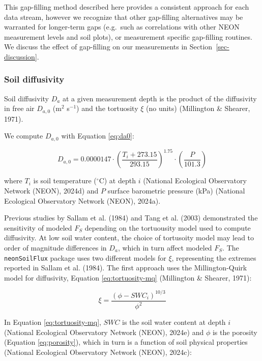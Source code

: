 \documentclass[
  letterpaper,
  DIV=11,
  numbers=noendperiod]{scrartcl}
\begin{document}
This gap-filling method described here provides a consistent approach
for each data stream, however we recognize that other gap-filling
alternatives may be warranted for longer-term gaps (e.g.~such as
correlations with other NEON measurement levels and soil plots), or
measurement specific gap-filling routines. We discuss the effect of
gap-filling on our measurements in Section~\ref{sec-discussion}.

\subsubsection{Soil diffusivity}\label{sec-compute-diffusivity}

Soil diffusivity \(D_{a}\) at a given measurement depth is the product
of the diffusivity in free air \(D_{a,0}\) (m\(^{2}\) s\(^{-1}\)) and
the tortuosity \(\xi\) (no units) (Millington \& Shearer, 1971).

We compute \(D_{a,0}\) with Equation \ref{eq:da0}:

\begin{equation}
  D_{a,0} = 0.0000147 \cdot \left( \frac{T_{i} + 273.15}{293.15} \right)^{1.75} \cdot \left( \frac{P}{101.3} \right)
  \label{eq:da0}
\end{equation}

where \(T_{i}\) is soil temperature (\(^\circ\)C) at depth \(i\)
(National Ecological Observatory Network (NEON), 2024d) and \(P\)
surface barometric pressure (kPa) (National Ecological Observatory
Network (NEON), 2024a).

Previous studies by Sallam et al. (1984) and Tang et al. (2003)
demonstrated the sensitivity of modeled \(F_{S}\) depending on the
tortuousity model used to compute diffusivity. At low soil water
content, the choice of tortusoity model may lead to order of magnitude
differences in \(D_{a}\), which in turn affect modeled \(F_{S}\). The
\texttt{neonSoilFlux} package uses two different models for \(\xi\),
representing the extremes reported in Sallam et al. (1984). The first
approach uses the Millington-Quirk model for diffusivity, Equation
\ref{eq:tortuosity-mq} (Millington \& Shearer, 1971):

\begin{equation}
  \xi = \frac{(\phi - SWC_{i})^{10/3}}{\phi^{2}}
  \label{eq:tortuosity-mq}
\end{equation}

In Equation \ref{eq:tortuosity-mq}, \(SWC\) is the soil water content at
depth \(i\) (National Ecological Observatory Network (NEON), 2024e) and
\(\phi\) is the porosity (Equation \ref{eq:porosity}), which in turn is
a function of soil physical properties (National Ecological Observatory
Network (NEON), 2024c):
\end{document}
